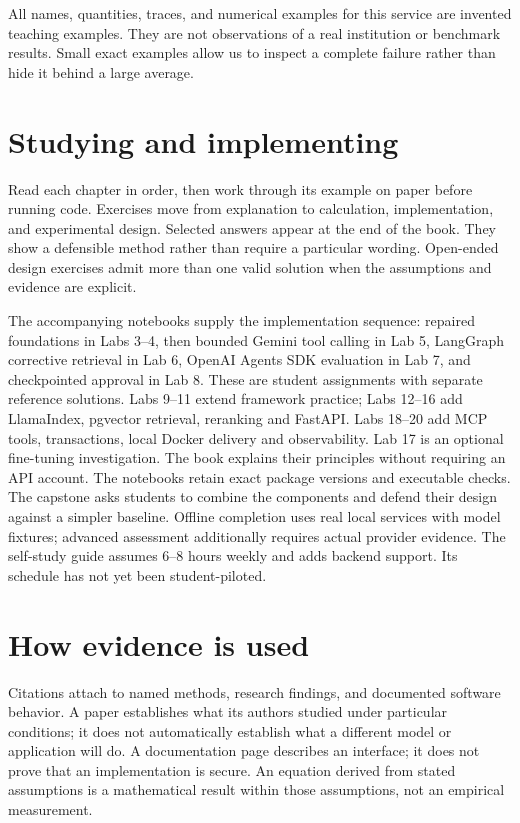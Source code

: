 All names, quantities, traces, and numerical examples for this service are invented teaching examples. They are not observations of a real institution or benchmark results. Small exact examples allow us to inspect a complete failure rather than hide it behind a large average.

\section*{Studying and implementing}
Read each chapter in order, then work through its example on paper before running code. Exercises move from explanation to calculation, implementation, and experimental design. Selected answers appear at the end of the book. They show a defensible method rather than require a particular wording. Open-ended design exercises admit more than one valid solution when the assumptions and evidence are explicit.

The accompanying notebooks supply the implementation sequence: repaired foundations in Labs 3–4, then bounded Gemini tool calling in Lab 5, LangGraph corrective retrieval in Lab 6, OpenAI Agents SDK evaluation in Lab 7, and checkpointed approval in Lab 8. These are student assignments with separate reference solutions. Labs 9–11 extend framework practice; Labs 12–16 add LlamaIndex, pgvector retrieval, reranking and FastAPI. Labs 18–20 add MCP tools, transactions, local Docker delivery and observability. Lab 17 is an optional fine-tuning investigation. The book explains their principles without requiring an API account. The notebooks retain exact package versions and executable checks. The capstone asks students to combine the components and defend their design against a simpler baseline. Offline completion uses real local services with model fixtures; advanced assessment additionally requires actual provider evidence. The self-study guide assumes 6–8 hours weekly and adds backend support. Its schedule has not yet been student-piloted.

\section*{How evidence is used}
Citations attach to named methods, research findings, and documented software behavior. A paper establishes what its authors studied under particular conditions; it does not automatically establish what a different model or application will do. A documentation page describes an interface; it does not prove that an implementation is secure. An equation derived from stated assumptions is a mathematical result within those assumptions, not an empirical measurement.

